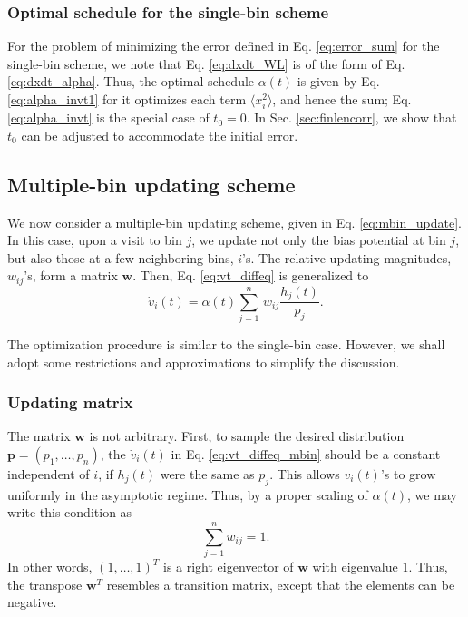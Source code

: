 \documentclass[reprint, floatfix]{revtex4-1}
\begin{document}
\subsubsection{Optimal schedule for the single-bin scheme}



For the problem of
minimizing the error defined in Eq. \eqref{eq:error_sum}
for the single-bin scheme,
we note that Eq. \eqref{eq:dxdt_WL}
is of the form of Eq. \eqref{eq:dxdt_alpha}.
%
Thus,
the optimal schedule $\alpha(t)$ is given by
Eq. \eqref{eq:alpha_invt1}
for it optimizes each term $\langle x_i^2 \rangle$,
and hence the sum;
Eq. \eqref{eq:alpha_invt}
is the special case of $t_0 = 0$.
%
In Sec. \ref{sec:finlencorr},
we show that $t_0$ can be adjusted
to accommodate the initial error.



\subsection{\label{sec:multiple-bin}
Multiple-bin updating scheme}



We now consider a multiple-bin updating scheme,
given in Eq. \eqref{eq:mbin_update}.
%
In this case,
upon a visit to bin $j$,
we update not only the bias potential at bin $j$,
but also those at a few neighboring bins, $i$'s.
%
The relative updating magnitudes,
$w_{ij}$'s,
form a matrix $\mathbf w$.
%
Then, Eq. \eqref{eq:vt_diffeq} is generalized to
\begin{equation}
  \dot v_i(t)
  =
  \alpha(t) \sum_{j=1}^n \, w_{ij} \frac{ h_j(t) } { p_j }.
  \label{eq:vt_diffeq_mbin}
\end{equation}


The optimization procedure is similar to the single-bin case.
However, we shall adopt some restrictions and approximations
to simplify the discussion.



\subsubsection{\label{sec:updating-matrix}
Updating matrix}



The matrix $\mathbf w$ is not arbitrary.
%
First, to sample
the desired distribution
$\mathbf p = (p_1, \dots, p_n)$,
the $\dot v_i(t)$
in Eq. \eqref{eq:vt_diffeq_mbin}
should be a constant independent of $i$,
if $h_j(t)$ were the same as $p_j$.
%
This allows $v_i(t)$'s to grow uniformly
in the asymptotic regime.
%
Thus, by a proper scaling of $\alpha(t)$,
we may write this condition as
%
\begin{equation}
  \sum_{j = 1}^n w_{ij} = 1
  .
\label{eq:w_sumj}
\end{equation}
%
In other words, $(1, \dots, 1)^T$
is a right eigenvector of $\mathbf w$
with eigenvalue $1$.
%
Thus, the transpose $\mathbf w^T$
resembles a transition matrix,
except that the elements can be negative.
\end{document}
